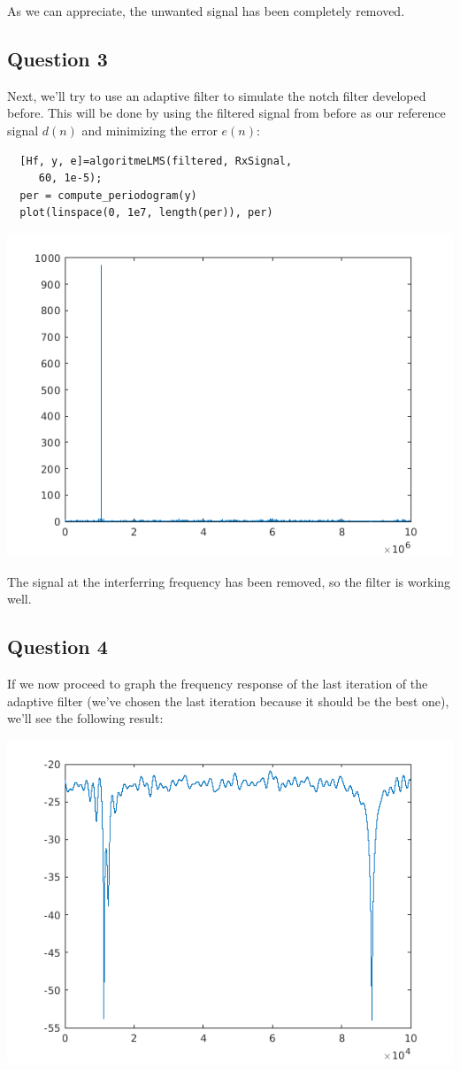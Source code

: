\documentclass[conference,9pt]{IEEEtran}
\begin{document}
As we can appreciate, the unwanted signal has been completely removed.

\subsection{Question 3}
Next, we'll try to use an adaptive filter to simulate the notch filter developed before. This will be done by using the filtered signal from before as our reference signal $d(n)$ and minimizing the error $e(n)$:

\begin{verbatim}
  [Hf, y, e]=algoritmeLMS(filtered, RxSignal,
     60, 1e-5);
  per = compute_periodogram(y)
  plot(linspace(0, 1e7, length(per)), per)
\end{verbatim}

\includegraphics[scale=0.6]{filtered-lms.png}

The signal at the interferring frequency has been removed, so the filter is working well.

\subsection{Question 4}
If we now proceed to graph the frequency response of the last iteration of the adaptive filter (we've chosen the last iteration because it should be the best one), we'll see the following result:

\includegraphics[scale=0.6]{freq-response.png}
\end{document}
